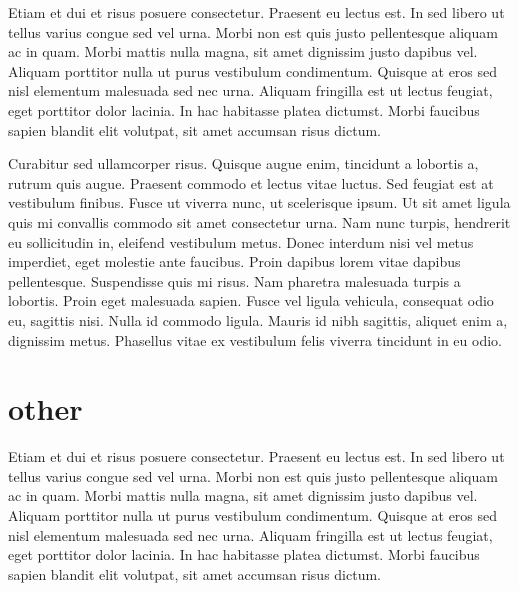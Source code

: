 \documentclass[12pt,letterpaper,oneside]{book}
\begin{document}
 Etiam et dui et risus posuere consectetur. Praesent eu lectus est. In sed libero ut tellus varius congue sed vel urna. Morbi non est quis justo pellentesque aliquam ac in quam. Morbi mattis nulla magna, sit amet dignissim justo dapibus vel. Aliquam porttitor nulla ut purus vestibulum condimentum. Quisque at eros sed nisl elementum malesuada sed nec urna. Aliquam fringilla est ut lectus feugiat, eget porttitor dolor lacinia. In hac habitasse platea dictumst. Morbi faucibus sapien blandit elit volutpat, sit amet accumsan risus dictum.

Curabitur sed ullamcorper risus. Quisque augue enim, tincidunt a lobortis a, rutrum quis augue. Praesent commodo et lectus vitae luctus. Sed feugiat est at vestibulum finibus. Fusce ut viverra nunc, ut scelerisque ipsum. Ut sit amet ligula quis mi convallis commodo sit amet consectetur urna. Nam nunc turpis, hendrerit eu sollicitudin in, eleifend vestibulum metus. Donec interdum nisi vel metus imperdiet, eget molestie ante faucibus. Proin dapibus lorem vitae dapibus pellentesque. Suspendisse quis mi risus. Nam pharetra malesuada turpis a lobortis. Proin eget malesuada sapien. Fusce vel ligula vehicula, consequat odio eu, sagittis nisi. Nulla id commodo ligula. Mauris id nibh sagittis, aliquet enim a, dignissim metus. Phasellus vitae ex vestibulum felis viverra tincidunt in eu odio. 

\section{other}
 Etiam et dui et risus posuere consectetur. Praesent eu lectus est. In sed libero ut tellus varius congue sed vel urna. Morbi non est quis justo pellentesque aliquam ac in quam. Morbi mattis nulla magna, sit amet dignissim justo dapibus vel. Aliquam porttitor nulla ut purus vestibulum condimentum. Quisque at eros sed nisl elementum malesuada sed nec urna. Aliquam fringilla est ut lectus feugiat, eget porttitor dolor lacinia. In hac habitasse platea dictumst. Morbi faucibus sapien blandit elit volutpat, sit amet accumsan risus dictum.
\end{document}
